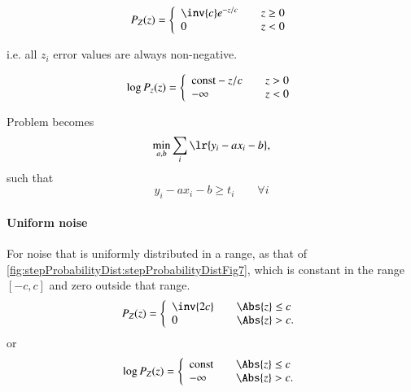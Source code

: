 \begin{dmath}\label{eqn:L1introduction:600}
P_Z(z) =
\left\{
\begin{array}{l l}
\inv{c} e^{-z/c} & \quad \mbox{\( z \ge 0 \)} \\
0 & \quad \mbox{\( z < 0 \)}
\end{array}
\right.
\end{dmath}

i.e. all \( z_i \) error values are always non-negative.

\begin{dmath}\label{eqn:L1introduction:620}
\log P_z(z) =
\left\{
\begin{array}{l l}
\textrm{const} - z/c & \quad \mbox{\( z > 0\)} \\
-\infty & \quad \mbox{\( z< 0\)}
\end{array}
\right.
\end{dmath}

Problem becomes
\begin{dmath}\label{eqn:L1introduction:640}
\min_{a, b} \sum_i \lr{ y_i - a x_i - b },
\end{dmath}
such that
\begin{equation}\label{eqn:L1introduction:660}
y_i - a x_i - b \ge t_i \qquad \forall i
\end{equation}
\paragraph{Uniform noise}
For noise that is uniformly distributed in a range, as that of \cref{fig:stepProbabilityDist:stepProbabilityDistFig7}, which is constant in the range \( [-c,c] \) and zero outside that range.
\begin{dmath}\label{eqn:L1introduction:680}
P_Z(z) =
\left\{
\begin{array}{l l}
\inv{2 c} & \quad \mbox{\( \Abs{z} \le c\)} \\
0 & \quad \mbox{\( \Abs{z} > c. \)}
\end{array}
\right.
\end{dmath}
or
\begin{dmath}\label{eqn:L1introduction:700}
\log P_Z(z) =
\left\{
\begin{array}{l l}
\textrm{const} & \quad \mbox{\( \Abs{z} \le c\)} \\
-\infty & \quad \mbox{\( \Abs{z} > c. \)}
\end{array}
\right.
\end{dmath}

